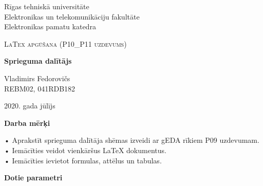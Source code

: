 \documentclass[12pt,a4paper]{report}
\begin{document}
\begin{titlepage}
	\centering
	\large{Rīgas tehniskā universitāte\\Elektronikas un telekomunikāciju fakultāte\\Elektronikas pamatu katedra\\}
	\vspace{4.5cm}
	{\scshape\Large LaTex apgūšana (P10\_P11 uzdevums)\par}
	\vspace{0.5cm}
	{\huge\bfseries Sprieguma dalītājs\\\par}
	\vspace{11cm}

	\begin{flushright}
	    {\Large Vladimirs Fedorovičs\\REBM02, 041RDB182\par}
	\end{flushright}

	\vfill
	{2020. gada jūlījs}
\end{titlepage}

\begin{center}
{\huge\bfseries Darba mērķi\par}
\end{center}
\vspace{0.5cm}
\setlength{\parindent}{0cm}
• Aprakstīt sprieguma dalītāja shēmas izveidi ar gEDA rīkiem P09 uzdevumam.\\
• Iemācīties veidot vienkāršus LaTeX dokumentus.\\
• Iemācīties ievietot formulas, attēlus un tabulas.
\vspace{2cm}


\begin{center}
{\huge\bfseries Dotie parametri\par}
\end{center}

\end{document}
